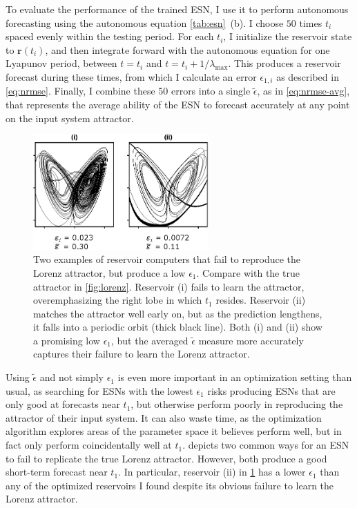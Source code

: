 To evaluate the performance of the trained ESN, I use it to perform
autonomous forecasting using the autonomous equation \cref{tab:esn}~(b). I choose $50$ times
$t_i$ spaced evenly within the testing period. For each $t_i$, I
initialize the reservoir state to $\mathbf{r}(t_i)$, and then
integrate forward with the autonomous equation for one Lyapunov
period, between $t = t_i$ and $t = t_i + 1 / \lambda_\text{max}$. This
produces a reservoir forecast during these times, from which I
calculate an error $\epsilon_{1,i}$ as described in
\cref{eq:nrmse}. Finally, I combine these $50$ errors into a single
$\tilde{\epsilon}$, as in \cref{eq:nrmse-avg}, that represents the
average ability of the ESN to forecast accurately at any point on the
input system attractor.

\begin{figure}
  \includegraphics[width=0.6\textwidth]{figures/epsilon-failure}
  \caption{Two examples of reservoir computers that fail to reproduce
    the Lorenz attractor, but produce a low $\epsilon_1$. Compare with
    the true attractor in \cref{fig:lorenz}. Reservoir (i) fails to
    learn the attractor, overemphasizing the right lobe in which $t_1$
    resides. Reservoir (ii) matches the attractor well early on, but
    as the prediction lengthens, it falls into a periodic orbit (thick
    black line). Both (i) and (ii) show a promising low $\epsilon_1$,
    but the averaged $\tilde{\epsilon}$ measure more accurately
    captures their failure to learn the Lorenz attractor.}%
  \label{fig:epsilon-failure}
\end{figure}

Using $\tilde{\epsilon}$ and not simply $\epsilon_1$ is even more
important in an optimization setting than usual, as searching for ESNs with the
lowest $\epsilon_1$ risks producing ESNs that are only good at
forecasts near $t_1$, but otherwise perform poorly in reproducing the
attractor of their input system. It can also waste time, as the
optimization algorithm explores areas of the parameter space it
believes perform well, but in fact only perform coincidentally well at $t_1$. 
depicts two common ways for an ESN to fail to replicate the true Lorenz
attractor. However, both produce a good
short-term forecast near $t_1$. In particular, reservoir (ii) in
\cref{fig:epsilon-failure} has a lower $\epsilon_1$ than any of
the optimized reservoirs I found despite its obvious failure to learn the
Lorenz attractor.

